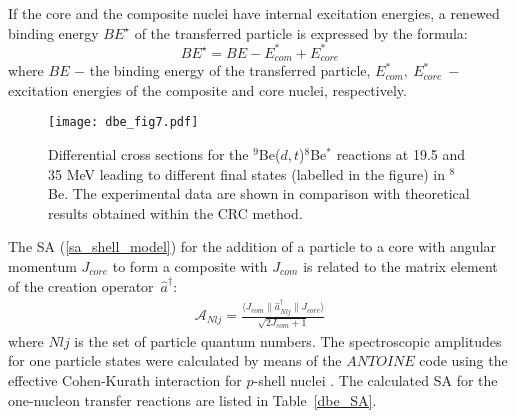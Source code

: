 \documentclass[
12pt, %
oneside, %
english, %
onehalfspacing, %
onehalfspacing, %
headsepline, %
]{MastersDoctoralThesis} %
\begin{document}
If the core and the composite nuclei have internal excitation energies, a renewed binding energy $BE^{\star}$ of the transferred particle is expressed by the formula:
\begin{equation} BE^{\star}=BE - E_{com}^*+E_{core}^* \end{equation}
where $BE$ $-$ the binding energy of the transferred particle, $E_{com}^*,~E_{core}^*~-$  excitation energies of the composite and  core nuclei, respectively.

\begin{figure}[tp]
\centering
\texttt{[image: dbe\_fig7.pdf]}
\decoRule
\caption{
\label{dbe_fig7}
\footnotesize Differential cross sections for the ${}^9$Be($d,t$)${}^{8}$Be$^*$ reactions at 19.5 and 35 MeV leading to different final states (labelled in the figure) in ${}^{8}$Be. The experimental data are shown in comparison with  theoretical results obtained within the CRC method.}
\end{figure}

The SA ({\ref{sa_shell_model}}) for the addition of a particle to a core with angular momentum $J_{core}$ to form a composite with $J_{com}$ is related to the matrix element of the creation operator~$\hat{a}^\dagger$:
\begin{eqnarray}\label{eq:SA}
\mathcal{A}_{Nlj} = \frac{\langle J_{com} \| \hat{a}^\dagger _{Nlj} \| J_{core}  \rangle}{\sqrt{2J_{com}+1}}
\end{eqnarray}
where $Nlj$ is the set of particle quantum numbers. The spectroscopic amplitudes for one particle states were calculated by means of the $ANTOINE$ code \cite{antoine}  using the effective Cohen-Kurath interaction for $p$-shell nuclei \cite{cohen1965}. The calculated SA for the one-nucleon transfer reactions are listed in Table~\ref{dbe_SA}.
\end{document}
